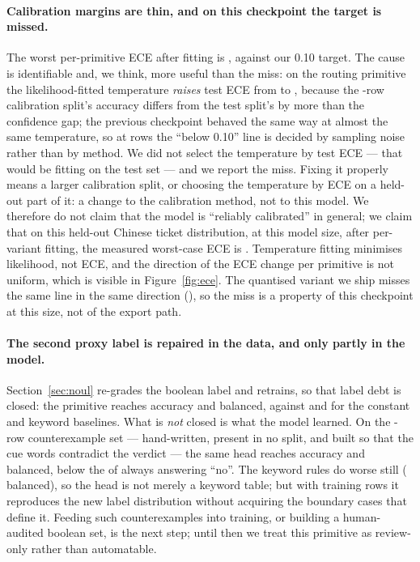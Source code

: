 \documentclass[11pt,a4paper]{article}
\begin{document}
\paragraph{Calibration margins are thin, and on this checkpoint the target is missed.} The worst per-primitive ECE after fitting is \WorstEce{}, against our \num{0.10} target. The cause is identifiable and, we think, more useful than the miss: on the routing primitive the likelihood-fitted temperature \emph{raises} test ECE from \EceBeforeChoice{} to \EceChoice{}, because the \RowsCalib-row calibration split's accuracy differs from the test split's by more than the confidence gap; the previous checkpoint behaved the same way at almost the same temperature, so at \RowsTest{} rows the ``below \num{0.10}'' line is decided by sampling noise rather than by method. We did not select the temperature by test ECE --- that would be fitting on the test set --- and we report the miss. Fixing it properly means a larger calibration split, or choosing the temperature by ECE on a held-out part of it: a change to the calibration method, not to this model. We therefore do not claim that the model is ``reliably calibrated'' in general; we claim that on this held-out Chinese ticket distribution, at this model size, after per-variant fitting, the measured worst-case ECE is \WorstEce{}. Temperature fitting minimises likelihood, not ECE, and the direction of the ECE change per primitive is not uniform, which is visible in Figure~\ref{fig:ece}. The quantised variant we ship misses the same line in the same direction (\EceWorstOnnx{}), so the miss is a property of this checkpoint at this size, not of the export path.

\paragraph{The second proxy label is repaired in the data, and only partly in the model.} Section~\ref{sec:noul} re-grades the boolean label and retrains, so that label debt is closed: the primitive reaches \AccNoul{} accuracy and \BAccNoul{} balanced, against \MajAccNoul{} and \RulesBAccNoul{} for the constant and keyword baselines. What is \emph{not} closed is what the model learned. On the \AntibodyN-row counterexample set --- hand-written, present in no split, and built so that the cue words contradict the verdict --- the same head reaches \AntibodyAcc{} accuracy and \AntibodyBAcc{} balanced, below the \AntibodyMajAcc{} of always answering ``no''. The keyword rules do worse still (\AntibodyRulesBAcc{} balanced), so the head is not merely a keyword table; but with \RowsTrain{} training rows it reproduces the new label distribution without acquiring the boundary cases that define it. Feeding such counterexamples into training, or building a human-audited boolean set, is the next step; until then we treat this primitive as review-only rather than automatable.
\end{document}
